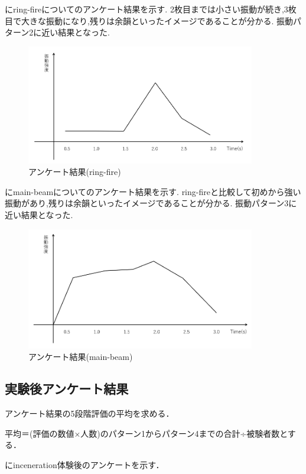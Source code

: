 にring-fireについてのアンケート結果を示す.
2枚目までは小さい振動が続き,3枚目で大きな振動になり,残りは余韻といったイメージであることが分かる.
振動パターン2に近い結果となった.
\begin{figure}[h]
\centering
\includegraphics[clip,width=10cm]{fig/ringfireAve.png}
\caption{アンケート結果(ring-fire)}\label{ringA}
\end{figure}



にmain-beamについてのアンケート結果を示す.
ring-fireと比較して初めから強い振動があり,残りは余韻といったイメージであることが分かる.
振動パターン3に近い結果となった.
\begin{figure}[h]
\centering
\includegraphics[clip,width=10cm]{fig/mainbeamAve.png}
\caption{アンケート結果(main-beam)}\label{mainA}
\end{figure}

\newpage
\subsection{実験後アンケート結果}
アンケート結果の5段階評価の平均を求める．

平均＝(評価の数値×人数)のパターン1からパターン4までの合計÷被験者数とする．

にinceneration体験後のアンケートを示す．

